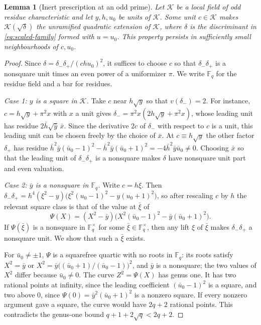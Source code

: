 \documentclass[11pt]{article}
\theoremstyle{plain}
\newtheorem{lemma}[theorem]{Lemma}
\theoremstyle{definition}
\theoremstyle{remark}
\newcommand{\F}{\mathbb F}
\begin{document}
\begin{lemma}[Inert prescription at an odd prime]\label{lem:scaled-holding}
Let $\mathcal K$ be a local field of odd residue characteristic and let
$y,h,u_0$ be units of $\mathcal K$.  Some unit $c\in\mathcal K$ makes
$\mathcal K(\sqrt\delta)$ the unramified quadratic extension of
$\mathcal K$, where $\delta$ is the discriminant in
\eqref{eq:scaled-family} formed with $u=u_0$.  This property
persists in sufficiently small neighbourhoods of $c,u_0$.
\end{lemma}
\begin{proof}
Since $\delta=\delta_-\delta_+/(chu_0)^2$, it suffices to choose $c$ so
that $\delta_-\delta_+$ is a nonsquare unit times an even power of a
uniformizer $\pi$.  We write $\F_q$ for the residue field and a bar for
residues.

\emph{Case 1: $y$ is a square in $\mathcal K$.}  Take $c$ near $h\sqrt y$
so that $v(\delta_-)=2$.  For instance, $c=h\sqrt y+\pi^2x$ with $x$ a unit
gives $\delta_-=\pi^2x(2h\sqrt y+\pi^2x)$, whose leading unit has residue
$2\bar h\sqrt{\bar y}\,\bar x$.  Since the derivative $2c$ of $\delta_-$
with respect to $c$ is a unit, this leading unit can be chosen freely by
the choice of $\bar x$.  At $c\equiv h\sqrt y$ the other factor $\delta_+$
has residue
$\bar h^2\bar y(\bar u_0-1)^2-\bar h^2\bar y(\bar u_0+1)^2
=-4\bar h^2\bar y\bar u_0\ne0$.  Choosing $\bar x$ so that the leading unit
of $\delta_-\delta_+$ is a nonsquare makes $\delta$ have nonsquare unit
part and even valuation.

\emph{Case 2: $\bar y$ is a nonsquare in $\F_q$.}  Write $c=h\xi$.  Then
$\delta_-\delta_+=h^4(\xi^2-y)\bigl(\xi^2(u_0-1)^2-y(u_0+1)^2\bigr)$, so
after rescaling $c$ by $h$ the relevant square class is that of the value
at $\bar\xi$ of
\[
 \Psi(X)=(X^2-\bar y)
       \bigl(X^2(\bar u_0-1)^2-\bar y(\bar u_0+1)^2\bigr).
\]
If $\Psi(\bar\xi)$ is a nonsquare in $\F_q^\times$ for some
$\bar\xi\in\F_q^\times$, then any lift $\xi$ of $\bar\xi$ makes
$\delta_-\delta_+$ a nonsquare unit.  We show that such a $\bar\xi$ exists.

For $\bar u_0\ne\pm1$, $\Psi$ is a squarefree quartic with no roots in
$\F_q$: its roots satisfy $X^2=\bar y$ or
$X^2=\bar y\bigl((\bar u_0+1)/(\bar u_0-1)\bigr)^2$, and $\bar y$ is a
nonsquare; the two values of $X^2$ differ because $\bar u_0\ne0$.  The
curve $Z^2=\Psi(X)$ has genus one.  It has two rational points at infinity,
since the leading coefficient $(\bar u_0-1)^2$ is a square, and two above
$0$, since $\Psi(0)=\bar y^2(\bar u_0+1)^2$ is a nonzero square.  If every
nonzero argument gave a square, the curve would have $2q+2$ rational
points.  This contradicts the genus-one bound $q+1+2\sqrt q<2q+2$.


\end{proof}
\end{document}

